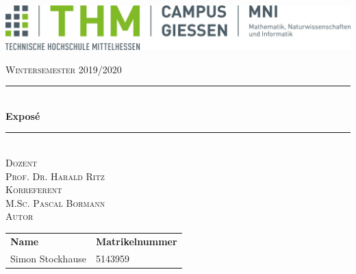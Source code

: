 \documentclass[a4paper]{article}
\begin{document}
\begin{titlepage} %
	\newcommand{\HRule}{\rule{\linewidth}{0.5mm}} %
	
	\centering %
	
	\includegraphics[width=\textwidth, height=0.7\textheight]{img/LOGO_MNI.png}
	\vfill
	
	\textsc{\Large Wintersemester 2019/2020}\\[0.5cm]
	
	
	
	
	\HRule\\[0.4cm]
	
	{\huge\bfseries Exposé }\\[0.4cm] %
	
	\HRule\\[1.5cm]
	\textsc{\Large Dozent}\\[0.5cm]
	\textsc{ Prof. Dr. Harald Ritz}\\[0.5cm] %
	\textsc{\Large Korreferent}\\[0.5cm]
	\textsc{ M.Sc. Pascal Bormann}\\[0.5cm] %
	\vspace{1.5cm}
	\textsc{\Large Autor}\\[0.8cm]
	
	\begin{tabular}{ll}
		\textbf{Name} & \textbf{Matrikelnummer}\\[0.5cm]
		Simon Stockhause & 5143959\\[0.5cm]
	\end{tabular}

	
	
	
	

\end{titlepage}
\end{document}
